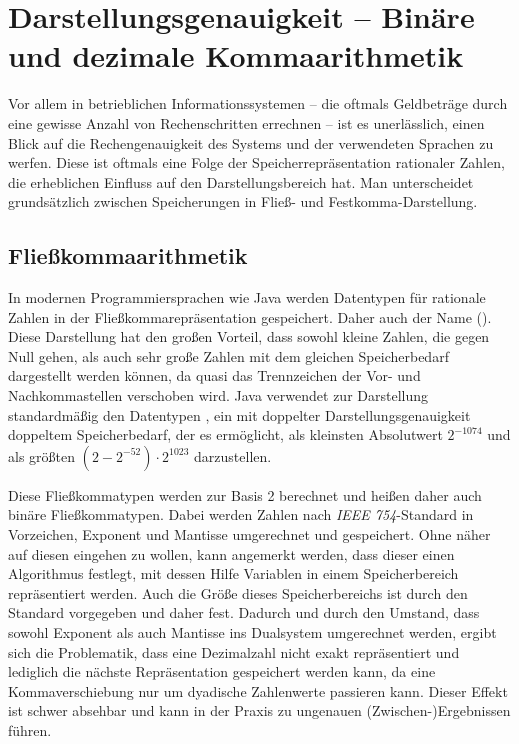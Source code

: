 \section{Darstellungsgenauigkeit -- Binäre und dezimale Kommaarithmetik}\label{rechengenauigkeit}
Vor allem in betrieblichen Informationssystemen -- die oftmals Geldbeträge durch eine gewisse Anzahl von Rechenschritten errechnen -- ist es unerlässlich, einen Blick auf die Rechengenauigkeit des Systems und der verwendeten Sprachen zu werfen. Diese ist oftmals eine Folge der Speicherrepräsentation rationaler Zahlen, die erheblichen Einfluss auf den Darstellungsbereich hat. Man unterscheidet grundsätzlich zwischen Speicherungen in Fließ- und Festkomma-Darstellung.
 
\subsection*{Fließkommaarithmetik}
In modernen Programmiersprachen wie Java werden Datentypen für rationale Zahlen in der Fließkommarepräsentation gespeichert. Daher auch der Name  (\engl {}). Diese Darstellung hat den großen Vorteil, dass sowohl kleine Zahlen, die gegen Null gehen, als auch sehr große Zahlen mit dem gleichen Speicherbedarf dargestellt werden können, da quasi das Trennzeichen der Vor- und Nachkommastellen verschoben wird. Java verwendet zur Darstellung standardmäßig den Datentypen , ein  mit doppelter Darstellungsgenauigkeit \bzw doppeltem Speicherbedarf, der es ermöglicht, als kleinsten Absolutwert $2^{-1074}$ und als größten $(2 - 2^{-52}) \cdot 2^{1023}$ darzustellen.

Diese Fließkommatypen werden zur Basis 2 berechnet und heißen daher auch binäre Fließkommatypen. Dabei werden Zahlen nach \textit{IEEE 754}-Standard in Vorzeichen, Exponent und Mantisse umgerechnet und gespeichert. Ohne näher auf diesen eingehen zu wollen, kann angemerkt werden, dass dieser einen Algorithmus festlegt, mit dessen Hilfe Variablen in einem Speicherbereich repräsentiert werden. Auch die Größe dieses Speicherbereichs ist durch den Standard vorgegeben und daher fest. Dadurch und durch den Umstand, dass sowohl Exponent als auch Mantisse ins Dualsystem umgerechnet werden, ergibt sich die Problematik, dass eine Dezimalzahl \uU nicht exakt repräsentiert und lediglich die nächste Repräsentation gespeichert werden kann, da eine Kommaverschiebung nur um dyadische Zahlenwerte passieren kann. Dieser Effekt ist schwer absehbar und kann in der Praxis zu ungenauen (Zwischen-)Ergebnissen führen.

